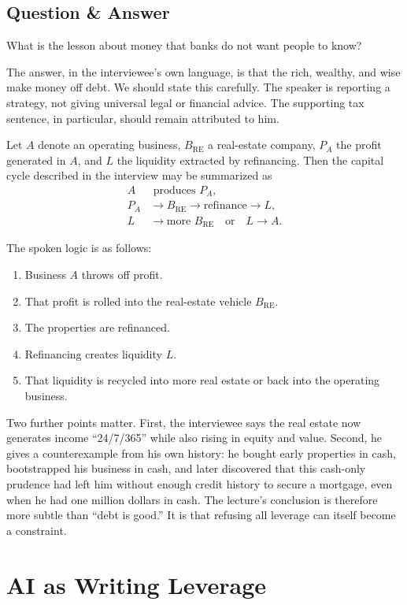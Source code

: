 \subsection{Question \& Answer}

What is the lesson about money that banks do not want people to know?

The answer, in the interviewee's own language, is that the rich, wealthy, and wise make money off debt. We should state this carefully. The speaker is reporting a strategy, not giving universal legal or financial advice. The supporting tax sentence, in particular, should remain attributed to him.

Let \(A\) denote an operating business, \(B_{\mathrm{RE}}\) a real-estate company, \(P_A\) the profit generated in \(A\), and \(L\) the liquidity extracted by refinancing. Then the capital cycle described in the interview may be summarized as
\begin{align}
A &\text{ produces } P_A,\\
P_A &\to B_{\mathrm{RE}} \to \text{refinance} \to L,\\
L &\to \text{more } B_{\mathrm{RE}} \quad \text{or} \quad L \to A.
\end{align}

The spoken logic is as follows:
\begin{enumerate}
\item Business \(A\) throws off profit.
\item That profit is rolled into the real-estate vehicle \(B_{\mathrm{RE}}\).
\item The properties are refinanced.
\item Refinancing creates liquidity \(L\).
\item That liquidity is recycled into more real estate or back into the operating business.
\end{enumerate}

Two further points matter. First, the interviewee says the real estate now generates income ``24/7/365'' while also rising in equity and value. Second, he gives a counterexample from his own history: he bought early properties in cash, bootstrapped his business in cash, and later discovered that this cash-only prudence had left him without enough credit history to secure a mortgage, even when he had one million dollars in cash. The lecture's conclusion is therefore more subtle than ``debt is good.'' It is that refusing all leverage can itself become a constraint.

\section{AI as Writing Leverage}

